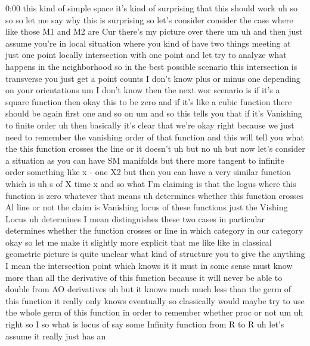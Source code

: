 \begin{unfinished}{0:00}
this  kind  of  simple  space  it's  kind  of
surprising  that  this  should  work  uh  so
so  so  let  me  say  why  this  is  surprising
so  let's
consider  consider  the
case  where  like  those  M1  and  M2  are
Cur  there's  my  picture  over  there
um
uh  and  then  just  assume  you're  in  local
situation  where  you  kind  of  have  two
things  meeting  at  just  one
point  locally
intersection  with  one
point  and  let  try  to  analyze  what
happens  in  the  neighborhood  so  in  the
best  possible  scenario  this  intersection
is  transverse  you  just  get  a  point
counts  I  don't  know  plus  or  minus  one
depending  on  your  orientations  um  I
don't  know  then  the  next  wor  scenario  is
if  it's  a  square  function  then  okay  this
to  be  zero  and  if  it's  like  a  cubic
function  there  should  be  again  first  one
and  so  on  um  and
so  this  tells  you  that  if  it's  Vanishing
to  finite
order
uh  then  basically  it's  clear  that  we're
okay  right  because  we  just  need  to
remember  the  vanishing  order  of  that
function  and  this  will  tell  you  what  the
this  function  crosses  the  line  or  it
doesn't  uh
but
no
uh  but  now  let's  consider  a  situation  as
you  can  have  SM  manifolds  but  there  more
tangent  to  infinite  order  something  like
x  -  one  X2  but  then  you  can  have  a  very
similar  function  which
is  uh  s  of  X  time
x
and  so  what  I'm  claiming  is  that  the
logus  where  this  function  is
zero  whatever  that  means  uh  determines
whether  this  function  crosses  Al  line  or
not  the  claim
is  Vanishing  locus  of  these
functions  just  the  Vishing  Locus  uh
determines
I  mean  distinguishes  these  two  cases  in
particular  determines  whether  the
function  crosses  or
line  in  which
category  in  our  category
okay  so  let  me  make  it  slightly  more
explicit  that  me  like  like  in
classical  geometric  picture  is  quite
unclear  what  kind  of  structure  you  to
give  the  anything  I  mean  the
intersection  point  which  knows  it  it
must  in  some  sense  must  know  more  than
all  the  derivative  of  this  function
because  it  will  never  be  able  to  double
from  AO
derivatives  uh  but  it  knows  much  much
less  than  the  germ  of  this  function  it
really  only  knows  eventually  so
classically  would  maybe  try  to  use  the
whole  germ  of  this  function  in  order  to
remember  whether  proc  or
not
um
uh  right
so  I  so  what  is
locus  of  say  some  Infinity  function  from
R  to
R
uh  let's  assume  it  really  just  has  an

\end{unfinished}
